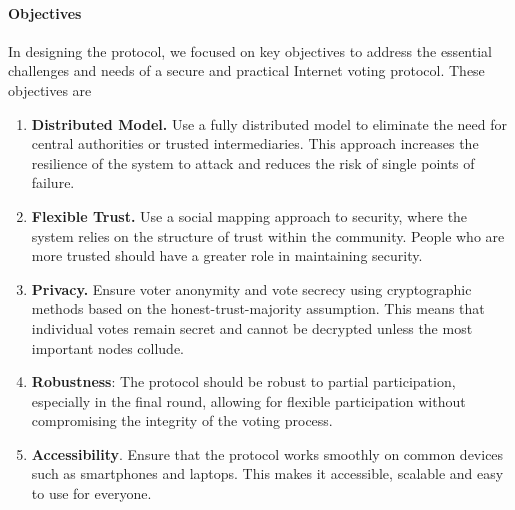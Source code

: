 \documentclass[runningheads]{llncs}
\begin{document}
\paragraph{Objectives}
In designing the protocol, we focused on key objectives to address the essential challenges and needs of a secure and practical Internet voting protocol. These objectives are

\begin{enumerate}
    \item \textbf{Distributed Model.} Use a fully distributed model to eliminate the need for central authorities or trusted intermediaries. This approach increases the resilience of the system to attack and reduces the risk of single points of failure.
    \item \textbf{Flexible Trust.} Use a social mapping approach to security, where the system relies on the structure of trust within the community. People who are more trusted should have a greater role in maintaining security.
    \item \textbf{Privacy.} Ensure voter anonymity and vote secrecy using cryptographic methods based on the honest-trust-majority assumption. This means that individual votes remain secret and cannot be decrypted unless the most important nodes collude.
    \item \textbf{Robustness}: The protocol should be robust to partial participation, especially in the final round, allowing for flexible participation without compromising the integrity of the voting process.
    \item \textbf{Accessibility}. Ensure that the protocol works smoothly on common devices such as smartphones and laptops. This makes it accessible, scalable and easy to use for everyone.
\end{enumerate}


\newcommand{\PartySecretKey}[1]{\ensuremath{s_{#1}}}
\newcommand{\Party}[1]{\ensuremath{P_{#1}}}
\newcommand{\Parties}{\ensuremath{\mathbb{P}}}
\newcommand{\VotesSize}{\ensuremath{|\mathbb{V}}|}

\newcommand{\EncryptionKey}{\textbf{E}}
\newcommand{\DecryptionKey}{\textbf{d}}

\newcommand{\PartialDecryptionKey}[1]{\ensuremath{d_{#1}}}
\newcommand{\PartialEncryptionKey}[1]{\ensuremath{E_{#1}}}

\newcommand{\EncryptedPartialDecryptionKeyShare}[2]{\ensuremath{C_{#1,#2}}}
\newcommand{\SetOfEncryptedPartialDecryptionKeys}{\ensuremath{\mathbb{C}}}
\newcommand{\SetOfFDKG}{\ensuremath{\mathbb{D}}}
\newcommand{\SetOfSharesOfPartialDecryption}{\ensuremath{\mathbb{C}}}
\newcommand{\Voters}{\ensuremath{\mathbb{V}}}
\newcommand{\Tallies}{\ensuremath{\mathbb{T}}}
\newcommand{\IthDecryptionKey}[1]{\ensuremath{d_{#1}}}
\newcommand{\IthEncryptionKey}[1]{E_{#1}}
\end{document}
